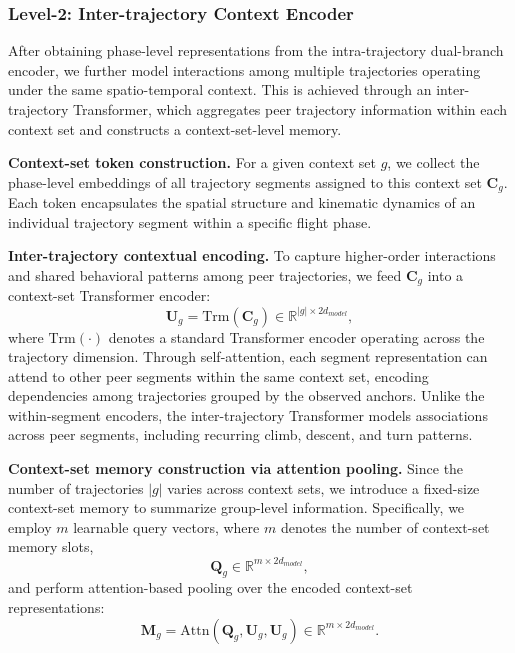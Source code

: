 \documentclass[iicol,pdflatex,sn-basic,Numbered]{sn-jnl}%
\theoremstyle{thmstyleone}%
\theoremstyle{thmstyletwo}%
\theoremstyle{thmstylethree}%
\begin{document}
\subsubsection{Level-2: Inter-trajectory Context Encoder}

After obtaining phase-level representations from the intra-trajectory dual-branch encoder, we further model interactions among multiple trajectories operating under the same spatio-temporal context. This is achieved through an inter-trajectory Transformer, which aggregates peer trajectory information within each context set and constructs a context-set-level memory.

\textbf{Context-set token construction.}
For a given context set $g$, we collect the phase-level embeddings of all trajectory segments assigned to this context set $\mathbf{C}_g$.
Each token encapsulates the spatial structure and kinematic dynamics of an individual trajectory segment within a specific flight phase.

\textbf{Inter-trajectory contextual encoding.}
To capture higher-order interactions and shared behavioral patterns among peer trajectories, we feed $\mathbf{C}_g$ into a context-set Transformer encoder:
\begin{equation}
\mathbf{U}_g = \mathrm{Trm}(\mathbf{C}_g)
\in \mathbb{R}^{|g| \times 2d_{model}},
\end{equation}
where $\mathrm{Trm}(\cdot)$ denotes a standard Transformer encoder operating across the trajectory dimension. 
Through self-attention, each segment representation can attend to other peer segments within the same context set, encoding dependencies among trajectories grouped by the observed anchors.
Unlike the within-segment encoders, the inter-trajectory Transformer models associations across peer segments, including recurring climb, descent, and turn patterns.

\textbf{Context-set memory construction via attention pooling.}
Since the number of trajectories $|g|$ varies across context sets, we introduce a fixed-size context-set memory to summarize group-level information. Specifically, we employ $m$ learnable query vectors, where $m$ denotes the number of context-set memory slots,
\begin{equation}
\mathbf{Q}_g \in \mathbb{R}^{m \times 2d_{model}},
\end{equation}
and perform attention-based pooling over the encoded context-set representations:
\begin{equation}
\label{eq:inter_traj}
\mathbf{M}_g = \mathrm{Attn}(\mathbf{Q}_g, \mathbf{U}_g, \mathbf{U}_g)
\in \mathbb{R}^{m \times 2d_{model}}.
\end{equation}
\end{document}
